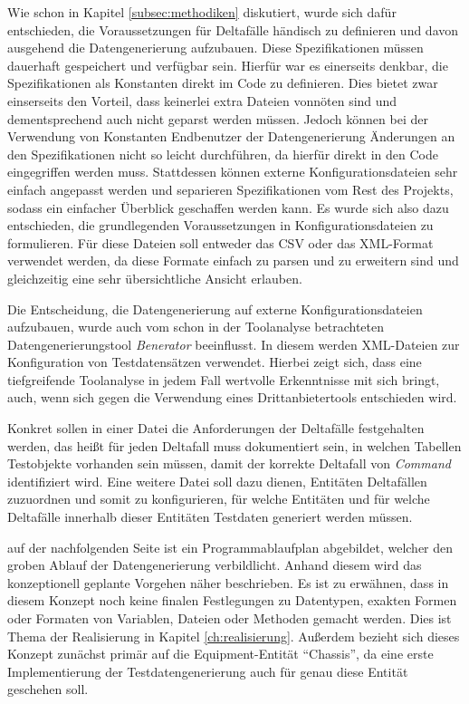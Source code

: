 Wie schon in Kapitel \ref{subsec:methodiken} diskutiert, wurde sich dafür entschieden, die Voraussetzungen für Deltafälle händisch zu definieren und davon ausgehend die Datengenerierung aufzubauen. Diese Spezifikationen müssen dauerhaft gespeichert und verfügbar sein. Hierfür war es einerseits denkbar, die Spezifikationen als Konstanten direkt im Code zu definieren. Dies bietet zwar einserseits den Vorteil, dass keinerlei extra Dateien vonnöten sind und dementsprechend auch nicht geparst werden müssen. Jedoch können bei der Verwendung von Konstanten Endbenutzer der Datengenerierung Änderungen an den Spezifikationen nicht so leicht durchführen, da hierfür direkt in den Code eingegriffen werden muss. Stattdessen können externe Konfigurationsdateien sehr einfach angepasst werden und separieren Spezifikationen vom Rest des Projekts, sodass ein einfacher Überblick geschaffen werden kann. Es wurde sich also dazu entschieden, die grundlegenden Voraussetzungen in Konfigurationsdateien zu formulieren. Für diese Dateien soll entweder das \ac{CSV} oder das \ac{XML}-Format verwendet werden, da diese Formate einfach zu parsen und zu erweitern sind und gleichzeitig eine sehr übersichtliche Ansicht erlauben.

Die Entscheidung, die Datengenerierung auf externe Konfigurationsdateien aufzubauen, wurde auch vom schon in der Toolanalyse betrachteten Datengenerierungstool \textit{Benerator} beeinflusst. In diesem werden \ac{XML}-Dateien zur Konfiguration von Testdatensätzen verwendet. \cite{benerator:2022} Hierbei zeigt sich, dass eine tiefgreifende Toolanalyse in jedem Fall wertvolle Erkenntnisse mit sich bringt, auch, wenn sich gegen die Verwendung eines Drittanbietertools entschieden wird.

Konkret sollen in einer Datei die Anforderungen der Deltafälle festgehalten werden, das heißt für jeden Deltafall muss dokumentiert sein, in welchen Tabellen Testobjekte vorhanden sein müssen, damit der korrekte Deltafall von \textit{Command} identifiziert wird. Eine weitere Datei soll dazu dienen, Entitäten Deltafällen zuzuordnen und somit zu konfigurieren, für welche Entitäten und für welche Deltafälle innerhalb dieser Entitäten Testdaten generiert werden müssen.

auf der nachfolgenden Seite ist ein Programmablaufplan abgebildet, welcher den groben Ablauf der Datengenerierung verbildlicht. Anhand diesem wird das konzeptionell geplante Vorgehen näher beschrieben. Es ist zu erwähnen, dass in diesem Konzept noch keine finalen Festlegungen zu Datentypen, exakten Formen oder Formaten von Variablen, Dateien oder Methoden gemacht werden. Dies ist Thema der Realisierung in Kapitel \ref{ch:realisierung}. Außerdem bezieht sich dieses Konzept zunächst primär auf die Equipment-Entität \enquote{Chassis}, da eine erste Implementierung der Testdatengenerierung auch für genau diese Entität geschehen soll.

